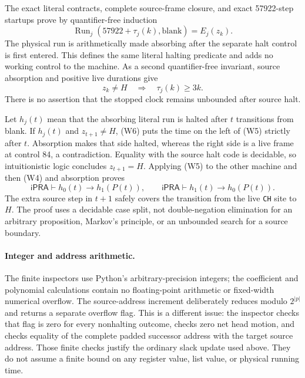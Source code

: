 The exact literal contracts, complete source-frame closure, and exact
57922-step startups prove by quantifier-free induction
\[
 \operatorname{Run}_j(57922+\tau_j(k),\mathrm{blank})=E_j(z_k).
                                                               \tag{W5}
\]
The physical run is arithmetically made absorbing after the separate
halt control is first entered.  This defines the same literal halting
predicate and adds no working control to the machine.  As a second
quantifier-free invariant, source absorption and positive live durations
give
\[
                 z_k\ne H\quad\Longrightarrow\quad
                 \tau_j(k)\ge3k.                    \tag{W6}
\]
There is no assertion that the stopped clock remains unbounded after
source halt.

Let $h_j(t)$ mean that the absorbing literal run is halted after $t$
transitions from blank.  If $h_j(t)$ and $z_{t+1}\ne H$, (W6) puts
the time on the left of (W5) strictly after $t$.  Absorption makes
that side halted, whereas the right side is a live frame at control
84, a contradiction.  Equality with the source halt code is decidable,
so intuitionistic logic concludes $z_{t+1}=H$.  Applying (W5) to the
other machine and then (W4) and absorption proves
\[
 \mathsf{iPRA}\vdash
 h_0(t)\longrightarrow h_1(P(t)),
 \qquad
 \mathsf{iPRA}\vdash
 h_1(t)\longrightarrow h_0(P(t)).                    \tag{W7}
\]
The extra source step in $t+1$ safely covers the transition from the
live \texttt{CH} site to $H$.  The proof uses a decidable case split,
not double-negation elimination for an arbitrary proposition, Markov's
principle, or an unbounded search for a source boundary.

\paragraph{Integer and address arithmetic.}
The finite inspectors use Python's arbitrary-precision integers;
the coefficient and polynomial calculations contain no floating-point
arithmetic or fixed-width numerical overflow.  The source-address
increment deliberately reduces modulo $2^{|p|}$ and returns a separate
overflow flag.  This is a different issue: the inspector checks that
flag is zero for every nonhalting outcome, checks zero net head motion,
and checks equality of the complete padded successor address with the
target source address.  Those finite checks justify the ordinary
slack update used above.  They do not assume a finite bound on any
register value, list value, or physical running time.
